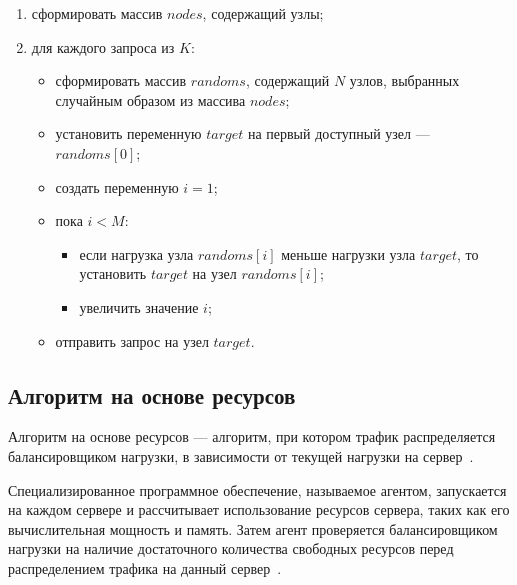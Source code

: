 \begin{enumerate}
	\item сформировать массив $nodes$, содержащий узлы;
	\item для каждого запроса из $K$:
	\begin{itemize}
		\item сформировать массив $randoms$, содержащий $N$ узлов, выбранных случайным образом из массива $nodes$;
		\item установить переменную $target$ на первый доступный узел --- $randoms[0]$;
		\item создать переменную $i = 1$;
		\item пока $i < M$:
		\begin{itemize}
			\item если нагрузка узла $randoms[i]$ меньше нагрузки узла $target$, то установить $target$ на узел $randoms[i]$;
			\item увеличить значение $i$;
		\end{itemize}
		\item отправить запрос на узел $target$.
	\end{itemize}
\end{enumerate}

\subsection{Алгоритм на основе ресурсов}

Алгоритм на основе ресурсов --- алгоритм, при котором трафик распределяется балансировщиком нагрузки, в зависимости от текущей нагрузки на сервер~\cite{aws}.

Специализированное программное обеспечение, называемое агентом, запускается на каждом сервере и рассчитывает использование ресурсов сервера, таких как его вычислительная мощность и память. 
Затем агент проверяется балансировщиком нагрузки на наличие достаточного количества свободных ресурсов перед распределением трафика на данный сервер~\cite{aws}.

